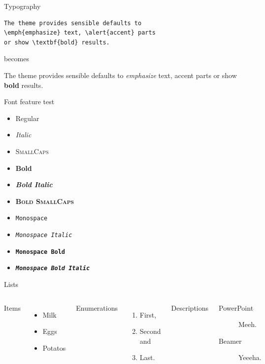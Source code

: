 \documentclass[10pt]{beamer}
\begin{document}
\begin{frame}[fragile]{Typography}
      \begin{verbatim}The theme provides sensible defaults to
\emph{emphasize} text, \alert{accent} parts
or show \textbf{bold} results.\end{verbatim}

  \begin{center}becomes\end{center}

  The theme provides sensible defaults to \emph{emphasize} text,
  \alert{accent} parts or show \textbf{bold} results.
\end{frame}

\begin{frame}{Font feature test}
  \begin{itemize}
    \item Regular
    \item \textit{Italic}
    \item \textsc{SmallCaps}
    \item \textbf{Bold}
    \item \textbf{\textit{Bold Italic}}
    \item \textbf{\textsc{Bold SmallCaps}}
    \item \texttt{Monospace}
    \item \texttt{\textit{Monospace Italic}}
    \item \texttt{\textbf{Monospace Bold}}
    \item \texttt{\textbf{\textit{Monospace Bold Italic}}}
  \end{itemize}
\end{frame}

\begin{frame}{Lists}
  \begin{columns}[T,onlytextwidth]
      Items
      \begin{itemize}
        \item Milk \item Eggs \item Potatos
      \end{itemize}

      Enumerations
      \begin{enumerate}
        \item First, \item Second and \item Last.
      \end{enumerate}

      Descriptions
      \begin{description}
        \item[PowerPoint] Meeh. \item[Beamer] Yeeeha.
      \end{description}
  \end{columns}
\end{frame}
\end{document}
